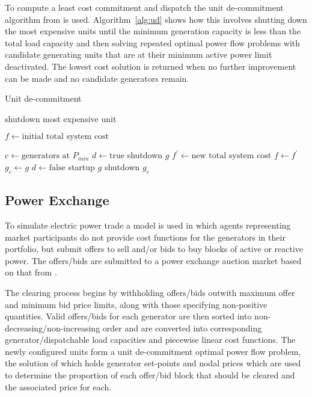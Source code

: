 To compute a least cost commitment and dispatch the unit de-commitment
algorithm from  is used.  Algorithm~\ref{alg:ud}
shows how this involves shutting down the most expensive units until the
minimum generation capacity is less than the total load capacity and then
solving repeated optimal power flow problems with candidate generating units
that are at their minimum active power limit deactivated.  The lowest cost
solution is returned when no further improvement can be made and no candidate
generators remain. \begin{algorithm}%
\caption{Unit de-commitment}
\label{alg:ud}
\begin{algorithmic}[1]
	\STATE shutdown most expensive unit
\ENDWHILE

\STATE $f \leftarrow \text{initial total system cost}$

\REPEAT
	\STATE $c \leftarrow \text{generators at } P_{min}$
		\STATE $d \leftarrow \text{true}$
		\STATE shutdown $g$
		\STATE $f^\prime \leftarrow \text{new total system cost}$
			\STATE $f \leftarrow f^\prime$
			\STATE $g_{c} \leftarrow g$
			\STATE $d \leftarrow \text{false}$
		\ENDIF
		\STATE startup $g$
	\ENDFOR
	\STATE shutdown $g_c$
\end{algorithmic}
\end{algorithm}

\subsection{Power Exchange}
To simulate electric power trade a model is used in which agents representing
market participants do not provide cost functions for the generators in their portfolio, but submit
offers to sell and/or bids to buy blocks of active or reactive power.  The
offers/bids are submitted to a power exchange auction market based on that from
.

The clearing process begins by withholding
offers/bids outwith maximum offer and minimum bid price limits, along with
those specifying non-positive quantities. Valid offers/bids for each generator
are then sorted into non-decreasing/non-increasing order and are converted
into corresponding generator/dispatchable load capacities and piecewise linear
cost functions. The newly configured units form a unit de-commitment optimal
power flow problem, the solution of which holds generator set-points and nodal
prices which are used to determine the proportion of each offer/bid block that
should be cleared and the associated price for each.

